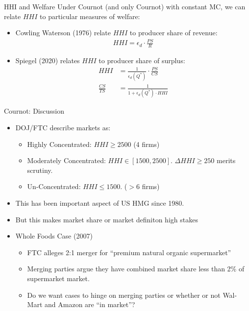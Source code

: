 \begin{frame}{HHI and Welfare}
Under Cournot (and only Cournot) with constant MC, we can relate $HHI$ to particular measures of welfare:
\begin{itemize}
\item Cowling Waterson (1976) relate $HHI$ to producer share of revenue:
\begin{align*}
HHI =  \epsilon_d \cdot \frac{PS}{R}
\end{align*}
\item Spiegel (2020) relates $HHI$ to producer share of surplus:
\begin{align*}
HHI &=  \frac{1}{\epsilon_d \left(Q^{*}\right)} \cdot \frac{PS}{CS}\\
\frac{C S}{TS} &=\frac{1}{1+\epsilon_d \left(Q^{*}\right) \cdot HHI}
\end{align*}
\end{itemize}
\end{frame}




\begin{frame}{Cournot: Discussion}

\begin{itemize}
\item DOJ/FTC describe markets as:
\begin{itemize}
\item Highly Concentrated: $HHI \geq 2500$ (4 firms)
\item Moderately Concentrated: $HHI \in [1500,2500]$. $\Delta HHI \geq 250$ merits scrutiny.
\item Un-Concentrated: $HHI \leq 1500$. ($>6$ firms)
\end{itemize}
\item This has been important aspect of US HMG since 1980.
\item But this makes \alert{market share} or \alert{market definiton} high stakes
\item Whole Foods Case (2007)
\begin{itemize}
\item FTC alleges 2:1 merger for ``premium natural organic supermarket''
\item Merging parties argue they have combined market share less than 2\% of supermarket market.
\item Do we want cases to hinge on merging parties or whether or not Wal-Mart and Amazon are ``in market''?
\end{itemize}
\end{itemize}
\end{frame}



